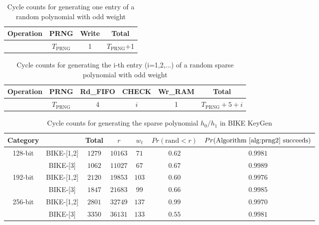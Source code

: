 \documentclass[runningheads]{llncs}
\begin{document}
\begin{table}[!tb]\centering
\caption{Cycle counts for generating  one entry of a random polynomial with odd weight}
\begin{tabular}{c|c|c|c}
  \hline
  Operation & PRNG & Write & Total \\\hline
   & $T_{\text{PRNG}}$ & 1  & $T_{\text{PRNG}}$+1 \\
  \hline
\end{tabular}
\end{table}

\begin{table}[!tb]\centering
\caption{Cycle counts for generating  the i-th entry (i=1,2,...) of a random sparse polynomial with odd weight}
\begin{tabular}{c|c|c|c|c|c}
  \hline
  Operation & PRNG & Rd\_FIFO & CHECK &Wr\_RAM & Total \\\hline
   & $T_{\text{PRNG}}$ & 4  & $i$ & 1 &$T_{\text{PRNG}}+5+i$ \\
  \hline
\end{tabular}
\end{table}

\begin{table}[!tb]\centering
\caption{Cycle counts for generating the sparse polynomial $h_0/h_1$ in BIKE KeyGen}
\begin{tabular}{cc|ccccc}
  \hline
 \textbf{Category}        &             & Total & $r$  & $w_t$  & $Pr(\text{rand} < r)$& $Pr(\text{Algorithm~\ref{alg:prng2} succeeds})$\\\hline
\multirow{ 2}{*}{128-bit} &  BIKE-[1,2] & $1279$ & $10163$  & $71$  & $0.62$ & $0.9981$\\
                          &  BIKE-[3] & $1062$ & $11027$  & $67$  & $0.67$& $0.9989$\\
  \hline
\multirow{ 2}{*}{192-bit} &  BIKE-[1,2] & $2120$ & $19853$  & $103$  &$0.60$& $0.9976$\\
                          &  BIKE-[3] & $1847$ & $21683$  & $99$  &$0.66$& $0.9985$\\
  \hline
\multirow{ 2}{*}{256-bit} &  BIKE-[1,2] & $2801$ & $32749$  & $137$  &$0.99$& $0.9970$\\
                          &  BIKE-[3] & $3350$ & $36131$  & $133$  &$0.55$& $0.9981$\\
  \hline
\end{tabular}
\end{table}
\end{document}
